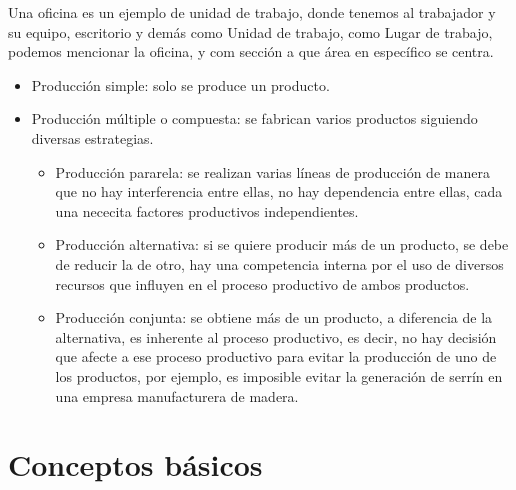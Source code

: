 \documentclass[12pt]{book} %
\providecommand{\tightlist}{%
  \setlength{\itemsep}{0pt}\setlength{\parskip}{0pt}}
\begin{document}
\begin{ejemplo}
Una oficina es un ejemplo de unidad de trabajo, donde tenemos al trabajador y su equipo, escritorio y demás como Unidad de trabajo, como Lugar de trabajo, podemos mencionar la oficina, y com sección a que área en específico se centra.
\end{ejemplo}

\begin{itemize}
\tightlist
\item
  Producción simple: solo se produce un producto.
\item
  Producción múltiple o compuesta: se fabrican varios productos
  siguiendo diversas estrategias.

  \begin{itemize}
  \tightlist
  \item
    Producción pararela: se realizan varias líneas de producción de
    manera que no hay interferencia entre ellas, no hay dependencia
    entre ellas, cada una nececita factores productivos independientes.
  \item
    Producción alternativa: si se quiere producir más de un producto, se
    debe de reducir la de otro, hay una competencia interna por el uso
    de diversos recursos que influyen en el proceso productivo de ambos
    productos.
  \item
    Producción conjunta: se obtiene más de un producto, a diferencia de
    la alternativa, es inherente al proceso productivo, es decir, no hay
    decisión que afecte a ese proceso productivo para evitar la
    producción de uno de los productos, por ejemplo, es imposible evitar
    la generación de serrín en una empresa manufacturera de madera.
  \end{itemize}
\end{itemize}





\hypertarget{conceptos-buxe1sicos}{%
\chapter{Conceptos básicos}\label{conceptos-buxe1sicos}}
\end{document}
